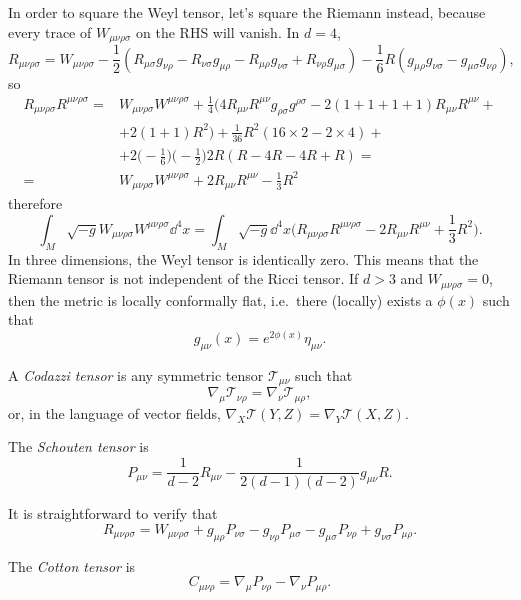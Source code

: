 \documentclass[a4paper,12pt]{book}
\begin{document}
In order to square the Weyl tensor, let's square the Riemann instead, because every trace of $W_{\mu\nu\rho\sigma}$ on the RHS will vanish. In $d=4$,
\[R_{\mu\nu\rho\sigma}=W_{\mu\nu\rho\sigma}-\frac12(R_{\mu\sigma}g_{\nu\rho}-R_{\nu\sigma}g_{\mu\rho}-R_{\mu\rho}g_{\nu\sigma}+R_{\nu\rho}g_{\mu\sigma})-\frac16R(g_{\mu\rho}g_{\nu\sigma}-g_{\mu\sigma}g_{\nu\rho}),\]
so
\begin{align*}
R_{\mu\nu\rho\sigma}R^{\mu\nu\rho\sigma}={}&W_{\mu\nu\rho\sigma}W^{\mu\nu\rho\sigma}+\frac14\bigl(4R_{\mu\nu}R^{\mu\nu}g_{\rho\sigma}g^{\rho\sigma}-2(1+1+1+1)R_{\mu\nu}R^{\mu\nu}+{}\\
&+2(1+1)R^2\bigr)+\frac1{36}R^2(16\times 2-2\times 4)+{}\\
&+2\biggl(-\frac16\biggr)\biggl(-\frac12\biggr)2R(R-4R-4R+R)=\\
={}&W_{\mu\nu\rho\sigma}W^{\mu\nu\rho\sigma}+2R_{\mu\nu}R^{\mu\nu}-\frac13R^2
\end{align*}
therefore
\[\int_M\sqrt{-g}W_{\mu\nu\rho\sigma}W^{\mu\nu\rho\sigma}\dd^4x=\int_M\sqrt{-g}\dd^4x\biggl(R_{\mu\nu\rho\sigma}R^{\mu\nu\rho\sigma}-2R_{\mu\nu}R^{\mu\nu}+\frac13R^2\biggr).\]
In three dimensions, the Weyl tensor is identically zero. This means that the Riemann tensor is not independent of the Ricci tensor. If $d>3$ and $W_{\mu\nu\rho\sigma}=0$, then the metric is locally conformally flat, i.e.~there (locally) exists a $\phi(x)$ such that
\[g_{\mu\nu}(x)=e^{2\phi(x)}\eta_{\mu\nu}.\]

\begin{definition}
A \emph{Codazzi tensor} is any symmetric tensor $\mathcal T_{\mu\nu}$ such that
\[\nabla_\mu\mathcal T_{\nu\rho}=\nabla_\nu\mathcal T_{\mu\rho},\]
or, in the language of vector fields, $\nabla_X\mathcal T(Y,Z)=\nabla_Y\mathcal T(X,Z)$.
\end{definition}

\begin{definition}
The \emph{Schouten tensor} is
\[P_{\mu\nu}=\frac1{d-2}R_{\mu\nu}-\frac1{2(d-1)(d-2)}g_{\mu\nu}R.\]
\end{definition}

It is straightforward to verify that
\[R_{\mu\nu\rho\sigma}=W_{\mu\nu\rho\sigma}+g_{\mu\rho}P_{\nu\sigma}-g_{\nu\rho}P_{\mu\sigma}-g_{\mu\sigma}P_{\nu\rho}+g_{\nu\sigma}P_{\mu\rho}.\]

\begin{definition}
The \emph{Cotton tensor} is
\[C_{\mu\nu\rho}=\nabla_\mu P_{\nu\rho}-\nabla_\nu P_{\mu\rho}.\]
\end{definition}
\end{document}

